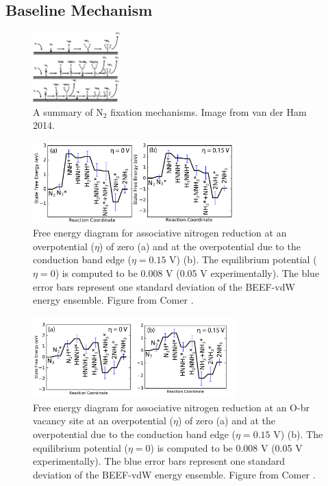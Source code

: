 \subsection{Baseline Mechanism}

\begin{figure}
\centering
\includegraphics[width=0.3\textwidth]{figures/proposal_figures/nitrogen_mechanisms.pdf}
\caption{A summary of N$_2$ fixation mechanisms. Image from van der Ham 2014\cite{van_der_Ham_2014}.}
\label{fig:N2_diss_mech}
\end{figure}

\begin{figure}[h]
\centering
\includegraphics[width=0.7\textwidth]{figures/proposal_figures/associative_FED.pdf}
\caption{Free energy diagram for associative nitrogen reduction at an overpotential ($\eta$) of zero (a) and at the overpotential due to the conduction band edge ($\eta=0.15$ V) (b). The equilibrium potential ($\eta=0$) is computed to be 0.008 V (0.05 V experimentally). The blue error bars represent one standard deviation of the BEEF-vdW energy ensemble. Figure from Comer \cite{Comer_sustainable}.}
\label{fig:associative_FED}
\end{figure}

\begin{figure}[h]
\centering
\includegraphics[width=0.7\textwidth]{figures/proposal_figures/defect_associative_FED.pdf}
\caption{Free energy diagram for associative nitrogen reduction at an O-br vacancy site at an overpotential ($\eta$) of zero (a) and at the overpotential due to the conduction band edge ($\eta=0.15$ V) (b). The equilibrium potential ($\eta=0$) is computed to be 0.008 V (0.05 V experimentally). The blue error bars represent one standard deviation of the BEEF-vdW energy ensemble. Figure from Comer \cite{Comer_sustainable}.}
\label{fig:defect_associative_FED}
\end{figure}

